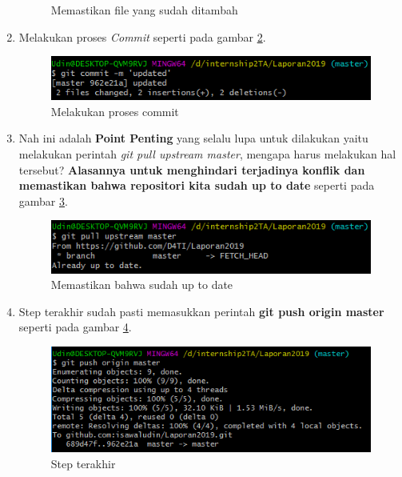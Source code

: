 \begin{enumerate}
\begin{figure}[!htbp]
      \caption{Memastikan file yang sudah ditambah}
      \label{fig:status1}
      \end{figure}
  \item Melakukan proses \textit{Commit} seperti pada gambar \ref{fig:commit}.
      \begin{figure}[!htbp]
      \centerline{\includegraphics[width=.75\textwidth]{Figures/manajemenkonflik/commit.png}}
      \caption{Melakukan proses commit}
      \label{fig:commit}
      \end{figure}
  \item Nah ini adalah \textbf{Point Penting} yang selalu lupa untuk dilakukan yaitu melakukan perintah \textit{git pull upstream master}, mengapa harus melakukan hal tersebut? \textbf{Alasannya untuk menghindari terjadinya konflik dan memastikan bahwa repositori kita sudah up to date} seperti pada gambar \ref{fig:pull}.
      \begin{figure}[!htbp]
      \centerline{\includegraphics[width=.75\textwidth]{Figures/manajemenkonflik/pull.png}}
      \caption{Memastikan bahwa sudah up to date}
      \label{fig:pull}
      \end{figure}
  \item Step terakhir sudah pasti memasukkan perintah \textbf{git push origin master} seperti pada gambar \ref{fig:push}.
      \begin{figure}[!htbp]
      \centerline{\includegraphics[width=.75\textwidth]{Figures/manajemenkonflik/push.png}}
      \caption{Step terakhir}
      \label{fig:push}
      \end{figure}
\end{enumerate}





